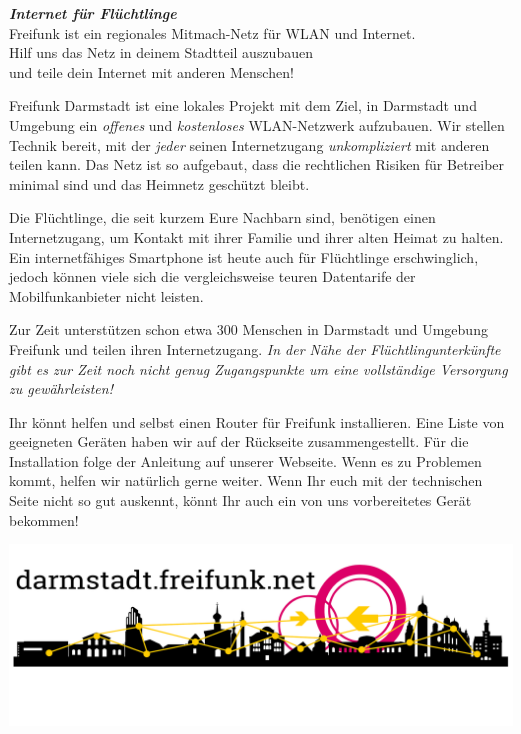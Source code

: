 \documentclass[a4paper]{article}
\begin{document}
\thispagestyle{empty}

\begin{center}
\Huge \textit{\textbf{\textcolor{freifunkpink}{Internet für Flüchtlinge}}} \\
\vspace{0.6cm}
\large Freifunk ist ein regionales Mitmach-Netz für WLAN und Internet.\\
Hilf uns das Netz in deinem Stadtteil auszubauen \\
und teile dein Internet mit anderen Menschen!
\normalsize

\vspace{1.0cm}
\end{center}

{ }
\vspace{0.5cm}

Freifunk Darmstadt ist eine lokales Projekt mit dem Ziel, in Darmstadt und Umgebung ein \emph{offenes} und \emph{kostenloses} WLAN-Netzwerk aufzubauen. Wir stellen Technik bereit, mit der \emph{jeder} seinen Internetzugang \emph{unkompliziert} mit anderen teilen kann. Das Netz ist so aufgebaut, dass die rechtlichen Risiken für Betreiber minimal sind und das Heimnetz geschützt bleibt.

Die Flüchtlinge, die seit kurzem Eure Nachbarn sind, benötigen einen Internetzugang, um Kontakt mit ihrer Familie und ihrer alten Heimat zu halten. Ein internetfähiges Smartphone ist heute auch für Flüchtlinge erschwinglich, jedoch können viele sich die vergleichsweise teuren Datentarife der Mobilfunkanbieter nicht leisten.

Zur Zeit unterstützen schon etwa 300 Menschen in Darmstadt und Umgebung Freifunk und teilen ihren Internetzugang. \emph{In der Nähe der Flüchtlingunterkünfte gibt es zur Zeit noch nicht genug Zugangspunkte um eine vollständige Versorgung zu gewährleisten!}

Ihr könnt helfen und selbst einen Router für Freifunk installieren. Eine Liste von geeigneten Geräten haben wir auf der Rückseite zusammengestellt. Für die Installation folge der Anleitung auf unserer Webseite. Wenn es zu Problemen kommt, helfen wir natürlich gerne weiter.
Wenn Ihr euch mit der technischen Seite nicht so gut auskennt, könnt Ihr auch ein von uns vorbereitetes Gerät bekommen!

\vspace{0.6cm}

\begin{center}
\includegraphics[width=\textwidth]{../images/footer_dark}
\end{center}
\end{document}
